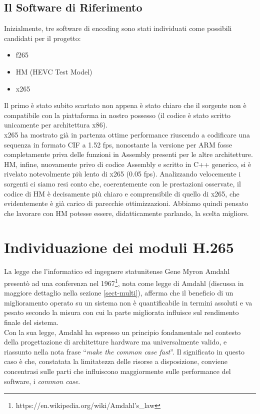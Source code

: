 \subsection{Il Software di Riferimento}
Inizialmente, tre software di encoding sono stati individuati come possibili
candidati per il progetto:
\begin{itemize}
	\item f265
	\item HM (HEVC Test Model)
	\item x265
\end{itemize}
Il primo è stato subito scartato non appena è stato chiaro che il sorgente non 
è compatibile con la piattaforma in nostro possesso (il codice è stato scritto 
unicamente per architettura x86).\\
x265 ha mostrato già in partenza ottime performance riuscendo a 
codificare una sequenza in formato CIF a 1.52 fps, nonostante la versione per 
ARM fosse completamente priva delle funzioni in Assembly presenti per le altre 
architetture.\\
HM, infine, nuovamente privo di codice Assembly e scritto in C++ generico, si è 
rivelato notevolmente più lento di x265 (0.05 fps). Analizzando velocemente i 
sorgenti 
ci siamo resi conto che, coerentemente con le prestazioni osservate, il codice 
di HM è decisamente più chiaro e comprensibile di quello di x265, che 
evidentemente è già carico di parecchie ottimizzazioni. Abbiamo quindi pensato 
che 
lavorare con HM potesse essere, didatticamente parlando, la scelta migliore.
\section{Individuazione dei moduli H.265}
La legge che l'informatico ed ingegnere statunitense Gene Myron Amdahl presentò 
ad una conferenza nel 
1967\footnote{https://en.wikipedia.org/wiki/Amdahl's\_law}, nota come legge di 
Amdahl (discussa in maggiore dettaglio nella sezione \ref{sect-multi}), afferma 
che il beneficio di un miglioramento operato su un sistema non è quantificabile 
in termini assoluti e va pesato secondo la misura con cui la parte migliorata 
influisce sul rendimento finale del sistema. \\
Con la sua legge, Amdahl ha espresso un principio fondamentale nel contesto 
della progettazione di architetture hardware ma universalmente valido, e 
riassunto nella nota frase ``\emph{make the common case fast}''. Il significato 
in questo caso è che, constatata la limitatezza delle risorse a disposizione, 
conviene concentrasi sulle parti che influiscono maggiormente sulle performance 
del software, i \emph{common case}.

